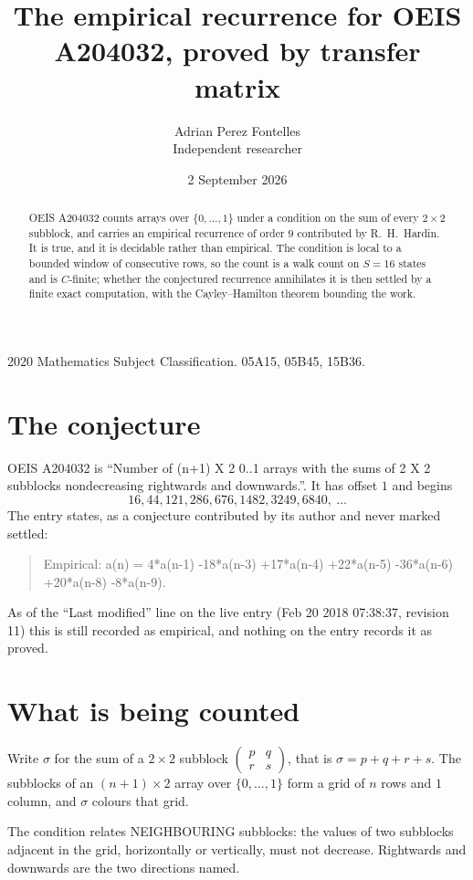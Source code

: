 \documentclass[11pt,a4paper]{article}
\title{The empirical recurrence for OEIS A204032, proved by transfer matrix}
\author{Adrian Perez Fontelles\\ \small Independent researcher}
\date{2 September 2026}
\theoremstyle{plain}
\theoremstyle{definition}
\begin{document}
\maketitle

\begin{abstract}
OEIS A204032 counts arrays over $\{0,\dots,1\}$ under a condition on the sum of every
$2\times2$ subblock, and carries an empirical recurrence of order $9$ contributed by
R.~H.~Hardin. It is true, and it is decidable rather than empirical. The condition is local to
a bounded window of consecutive rows, so the count is a walk count on $S=16$ states and is
$C$-finite; whether the conjectured recurrence annihilates it is then settled by a finite exact
computation, with the Cayley--Hamilton theorem bounding the work.
\end{abstract}

\noindent\small 2020 Mathematics Subject Classification. 05A15, 05B45, 15B36.\normalsize

\section{The conjecture}

OEIS A204032 is ``Number of (n+1) X 2 0..1 arrays with the sums of 2 X 2 subblocks nondecreasing rightwards and downwards.''. It has offset $1$ and begins
\[
16, 44, 121, 286, 676, 1482, 3249, 6840,\ \dots
\]
The entry states, as a conjecture contributed by its author and never marked settled:
\begin{quote}
Empirical: a(n) = 4*a(n-1) -18*a(n-3) +17*a(n-4) +22*a(n-5) -36*a(n-6) +20*a(n-8) -8*a(n-9).
\end{quote}
As of the ``Last modified'' line on the live entry (Feb 20 2018 07:38:37, revision 11) this is still
recorded as empirical, and nothing on the entry records it as proved.

\section{What is being counted}

Write $\sigma$ for the sum of a $2\times2$ subblock
$\begin{pmatrix}p&q\\r&s\end{pmatrix}$, that is $\sigma=p+q+r+s$. The subblocks of an
$(n+1)\times2$ array over $\{0,\dots,1\}$ form a grid of $n$ rows and $1$
column, and $\sigma$ colours that grid.

The condition relates NEIGHBOURING subblocks: the values of two subblocks adjacent in the grid,
horizontally or vertically, must not decrease. Rightwards and downwards are the two directions named.
\end{document}
